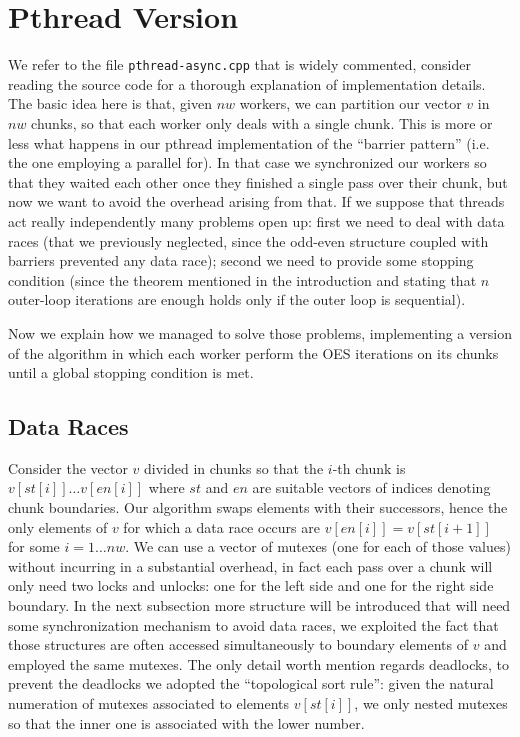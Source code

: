 \documentclass[12pt]{article}
\begin{document}
\section{Pthread Version}
We refer to the file \texttt{pthread-async.cpp} that is widely
commented, consider reading the source code for a thorough explanation of
implementation details. The basic idea here is that, given $nw$ workers, we can
partition our vector $v$ in $nw$ chunks, so that each worker only
deals with a single chunk. This is more or less what happens in our
pthread implementation of the ``barrier pattern'' (i.e. the one employing
a parallel for). In that case we synchronized our workers so that they
waited each other once they finished a single pass over their chunk, but now we want to
avoid the overhead arising from that. If we suppose that threads act
really independently many problems open up: first we need to deal with
data races (that we previously neglected, since the odd-even structure
coupled with barriers
prevented any data race); second we need to provide some stopping
condition (since the theorem mentioned in the introduction and stating
that $n$ outer-loop iterations are enough holds only if the outer loop
is sequential).

Now we explain how we managed to solve those problems, implementing a
version of the algorithm in which each worker perform the OES
iterations on its chunks until a global stopping condition is met.

\subsection{Data Races}
Consider the vector $v$ divided in chunks so that the $i$-th chunk is
$v[st[i]] \dots v[en[i]]$ where $st$ and $en$ are suitable vectors of
indices denoting chunk boundaries. Our algorithm swaps elements with
their successors, hence the only elements of $v$ for which a data race
occurs are $v[en[i]] = v[st[i + 1]]$ for some $i = 1 \dots nw$. We can use a vector
of mutexes (one for each of those values) without incurring in a
substantial overhead, in fact each pass over a chunk will only need
two locks and unlocks: one for the left side and one for the
right side boundary. In the next subsection more structure will be
introduced that will need some synchronization mechanism to avoid data
races, we exploited the fact that those structures are often accessed
simultaneously to boundary elements of $v$ and employed the same
mutexes. The only detail worth mention regards deadlocks, to prevent
the deadlocks we adopted the ``topological sort rule'': given the
natural numeration of mutexes associated to elements $v[st[i]]$, we
only nested mutexes so that the inner one is associated with the lower
number.
\end{document}
